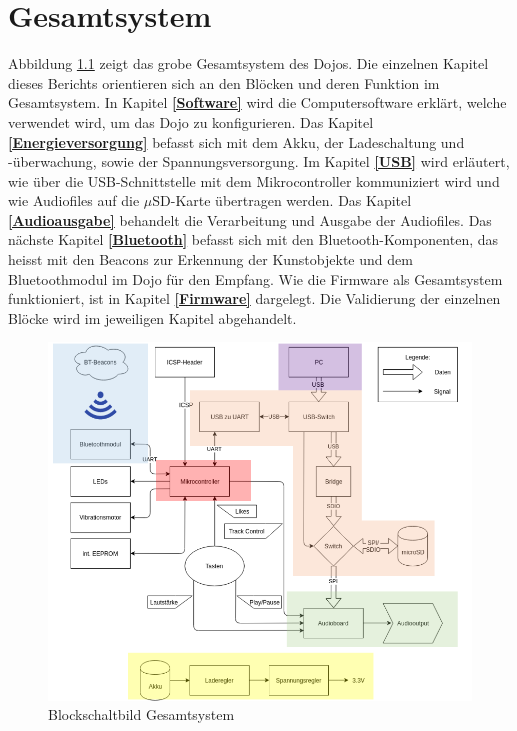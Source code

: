 \chapter{Gesamtsystem}
\label{Gesamtsystem}
\thispagestyle{fancy} 





Abbildung \ref{Blockschaltbild_Gesamtsystem} zeigt das grobe Gesamtsystem des Dojos. Die einzelnen Kapitel dieses Berichts orientieren sich an den Blöcken und deren Funktion im Gesamtsystem. In Kapitel \textbf{\ref{Software} } wird die Computersoftware erklärt, welche verwendet wird, um das Dojo zu konfigurieren. Das Kapitel \textbf{\ref{Energieversorgung} } befasst sich mit dem Akku, der Ladeschaltung und -überwachung, sowie der Spannungsversorgung. Im Kapitel \textbf{\ref{USB} } wird erläutert, wie über die USB-Schnittstelle mit dem Mikrocontroller kommuniziert wird und wie Audiofiles auf die $\mu$SD-Karte übertragen werden. Das Kapitel \textbf{\ref{Audioausgabe} } behandelt die Verarbeitung und Ausgabe der Audiofiles. Das nächste Kapitel \textbf{\ref{Bluetooth} } befasst sich mit den Bluetooth-Komponenten, das heisst mit den Beacons zur Erkennung der Kunstobjekte und dem Bluetoothmodul im Dojo für den Empfang. Wie die Firmware als Gesamtsystem funktioniert, ist in Kapitel \textbf{\ref{Firmware} } dargelegt. Die Validierung der einzelnen Blöcke wird im jeweiligen Kapitel abgehandelt.

\begin{figure}[h]
	\centering
	\includegraphics[width=14cm]{Bilder/Gesamtsystem.png}
	\caption{Blockschaltbild Gesamtsystem}
	\label{Blockschaltbild_Gesamtsystem}
\end{figure}

